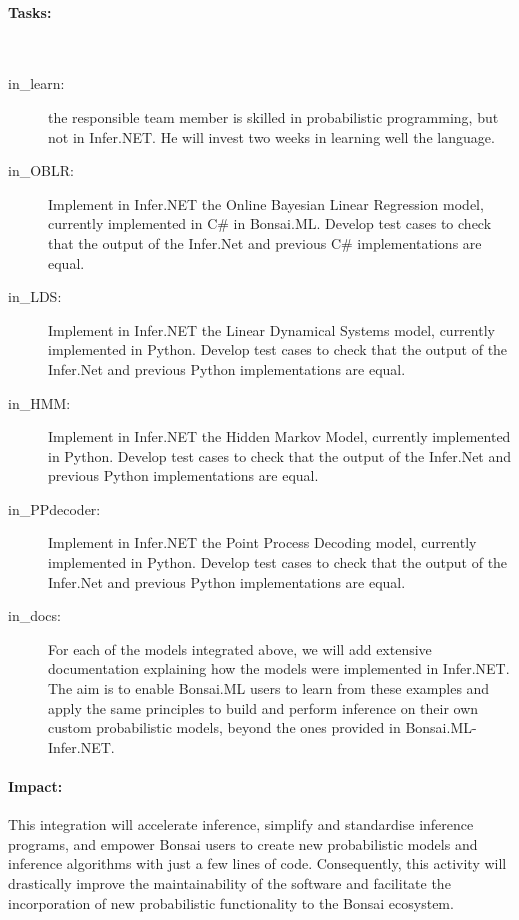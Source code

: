 \paragraph{Tasks:}\mbox{}\\

\begin{description}

    \item[in\_learn:] the responsible team member is skilled in probabilistic
        programming, but not in Infer.NET. He will invest two weeks in learning
        well the language.

    \item[in\_OBLR:]  Implement in Infer.NET the Online Bayesian Linear
        Regression model, currently implemented in C\# in Bonsai.ML. Develop
        test cases to check that the output of the Infer.Net and previous C\#
        implementations are equal.

    \item[in\_LDS:] Implement in Infer.NET the Linear Dynamical Systems model,
        currently implemented in Python. Develop test cases to check that the
        output of the Infer.Net and previous Python implementations are equal.

    \item[in\_HMM:] Implement in Infer.NET the Hidden Markov Model, currently
        implemented in Python. Develop test cases to check that the output of
        the Infer.Net and previous Python implementations are equal.

    \item[in\_PPdecoder:] Implement in Infer.NET the Point Process Decoding
        model, currently implemented in Python. Develop test cases to check
        that the output of the Infer.Net and previous Python implementations
        are equal.

    \item[in\_docs:] For each of the models integrated above, we will add
        extensive documentation explaining how the models were implemented in
        Infer.NET. The aim is to enable Bonsai.ML users to learn from these
        examples and apply the same principles to build and perform inference
        on their own custom probabilistic models, beyond the ones provided in
        Bonsai.ML-Infer.NET.

\end{description}

\paragraph{Impact:}
This integration will accelerate
inference, simplify and standardise inference programs, and empower Bonsai
users to create new probabilistic models and inference algorithms with just a
few lines of code. Consequently, this activity will drastically improve the
maintainability of the software and facilitate the incorporation of new
probabilistic functionality to the Bonsai ecosystem.

